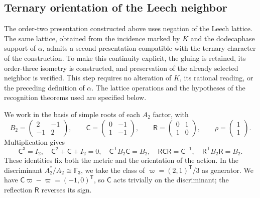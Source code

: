 \subsection{Ternary orientation of the Leech neighbor}
\label{km:orden-tres-reticular}

The order-two presentation constructed above uses negation
of the Leech lattice. The same lattice, obtained from the incidence marked
by \(K\) and the dodecaphase support of \(\alpha\), admits a second
presentation compatible with the ternary character of the construction.
To make this continuity explicit, the gluing is retained, its order-three
isometry is constructed, and preservation of the already selected neighbor
is verified. This step requires no alteration of \(K\), its rational reading,
or the preceding definition of \(\alpha\). The lattice operations and the
hypotheses of the recognition theorems used are specified below.

We work in the basis of simple roots of each \(A_2\) factor, with
\begin{equation}
 B_2=\begin{pmatrix}2&-1\\-1&2\end{pmatrix},\qquad
 \mathsf C=\begin{pmatrix}0&-1\\1&-1\end{pmatrix},\qquad
 \mathsf R=\begin{pmatrix}0&1\\1&0\end{pmatrix},\qquad
 \rho=\begin{pmatrix}1\\1\end{pmatrix}.
 \label{km:coxeter-reflexion}
\end{equation}
Multiplication gives
\[
 \mathsf C^3=I_2,\quad
 \mathsf C^2+\mathsf C+I_2=0,\quad
 \mathsf C^{\mathsf T}B_2\mathsf C=B_2,\quad
 \mathsf R\mathsf C\mathsf R=\mathsf C^{-1},\quad
 \mathsf R^{\mathsf T}B_2\mathsf R=B_2.
\]
These identities fix both the metric and the orientation of the action.
In the discriminant \(A_2^*/A_2\cong\mathbb F_3\), we take
the class of \(\varpi=(2,1)^{\mathsf T}/3\) as generator. We have
\(\mathsf C\varpi-\varpi=(-1,0)^{\mathsf T}\), so
\(\mathsf C\) acts trivially on the discriminant; the reflection
\(\mathsf R\) reverses its sign.

